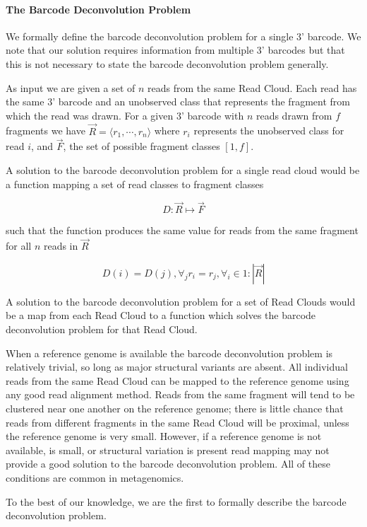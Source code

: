 \paragraph{The Barcode Deconvolution Problem}

We formally define the barcode deconvolution problem for a single 3' barcode. We note that our solution requires information from multiple 3' barcodes but that this is not necessary to state the barcode deconvolution problem generally. 

As input we are given a set of $n$ reads from the same Read Cloud. Each read has the same 3' barcode and an unobserved class that represents the fragment from which the read was drawn. For a given 3' barcode with $n$ reads drawn from $f$ fragments we have $\vec{R} = \langle r_1, \cdots, r_n \rangle$ where $r_i$ represents the unobserved class for read $i$, and $\vec{F}$, the set of possible fragment classes $[1, f]$. 

A solution to the barcode deconvolution problem for a single read cloud would be a function mapping a set of read classes to fragment classes 

\[D: \vec{R} \mapsto \vec{F}\]

such that the function produces the same value for reads from the same fragment for all $n$ reads in $\vec{R}$

\[D(i) = D(j),  \forall_j  r_i = r_j, \forall_i \in 1:|\vec{R}|\] 

A solution to the barcode deconvolution problem for a set of Read Clouds would be a map from each Read Cloud to a function which solves the barcode deconvolution problem for that Read Cloud.

When a reference genome is available the barcode deconvolution problem is relatively trivial, so long as major structural variants are absent. All individual reads from the same Read Cloud can be mapped to the reference genome using any good read alignment method. Reads from the same fragment will tend to be clustered near one another on the reference genome; there is little chance that reads from different fragments in the same Read Cloud will be proximal, unless the reference genome is very small. However, if a reference genome is not available, is small, or structural variation is present read mapping may not provide a good solution to the barcode deconvolution problem. All of these conditions are common in metagenomics.

To the best of our knowledge, we are the first to formally describe the barcode deconvolution problem.

